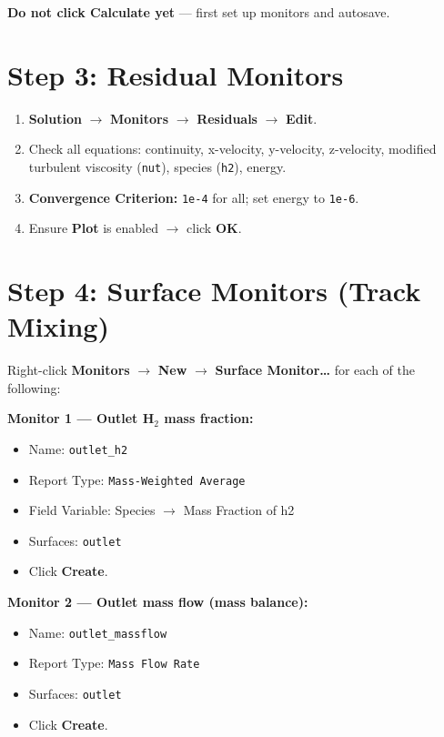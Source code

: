 \documentclass[12pt,a4paper]{report}
\begin{document}
\noindent\textbf{Do not click Calculate yet} --- first set up monitors
and autosave.

\section{Step 3: Residual Monitors}

\begin{enumerate}
  \item \textbf{Solution} $\rightarrow$ \textbf{Monitors}
        $\rightarrow$ \textbf{Residuals} $\rightarrow$ \textbf{Edit}.
  \item Check all equations: continuity, x-velocity, y-velocity,
        z-velocity, modified turbulent viscosity (\texttt{nut}),
        species (\texttt{h2}), energy.
  \item \textbf{Convergence Criterion:} \texttt{1e-4} for all; set
        energy to \texttt{1e-6}.
  \item Ensure \textbf{Plot} is enabled $\rightarrow$ click \textbf{OK}.
\end{enumerate}

\section{Step 4: Surface Monitors (Track Mixing)}

Right-click \textbf{Monitors} $\rightarrow$ \textbf{New} $\rightarrow$
\textbf{Surface Monitor\ldots} for each of the following:

\medskip
\noindent\textbf{Monitor 1 --- Outlet H$_2$ mass fraction:}
\begin{itemize}
  \item Name: \texttt{outlet\_h2}
  \item Report Type: \texttt{Mass-Weighted Average}
  \item Field Variable: Species $\rightarrow$ Mass Fraction of h2
  \item Surfaces: \texttt{outlet}
  \item Click \textbf{Create}.
\end{itemize}

\noindent\textbf{Monitor 2 --- Outlet mass flow (mass balance):}
\begin{itemize}
  \item Name: \texttt{outlet\_massflow}
  \item Report Type: \texttt{Mass Flow Rate}
  \item Surfaces: \texttt{outlet}
  \item Click \textbf{Create}.
\end{itemize}
\end{document}
